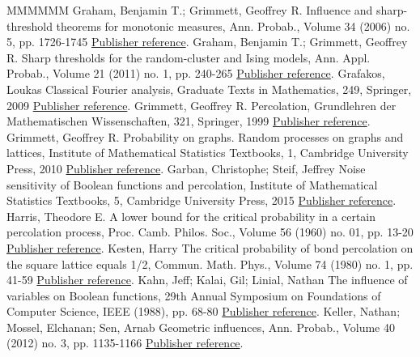 \documentclass[11pt]{article}
\theoremstyle{definition}
\numberwithin{equation}{section}
\begin{document}
\begin{thebibliography}{MMMMMM}
 Graham, Benjamin T.; Grimmett, Geoffrey R. Influence and sharp-threshold theorems for monotonic measures, Ann. Probab., Volume 34 (2006) no. 5, pp. 1726-1745 \href{https://ahl.centre-mersenne.org/item/AHL_2020__3__169_0/#graham2006influence}{Publisher reference}.
 Graham, Benjamin T.; Grimmett, Geoffrey R. Sharp thresholds for the random-cluster and Ising models, Ann. Appl. Probab., Volume 21 (2011) no. 1, pp. 240-265 \href{https://ahl.centre-mersenne.org/item/AHL_2020__3__169_0/#graham2011sharp}{Publisher reference}.
 Grafakos, Loukas Classical Fourier analysis, Graduate Texts in Mathematics, 249, Springer, 2009 \href{https://ahl.centre-mersenne.org/item/AHL_2020__3__169_0/#grafakos}{Publisher reference}.
 Grimmett, Geoffrey R. Percolation, Grundlehren der Mathematischen Wissenschaften, 321, Springer, 1999 \href{https://ahl.centre-mersenne.org/item/AHL_2020__3__169_0/#grimmett1999percolation}{Publisher reference}.
 Grimmett, Geoffrey R. Probability on graphs. Random processes on graphs and lattices, Institute of Mathematical Statistics Textbooks, 1, Cambridge University Press, 2010 \href{https://ahl.centre-mersenne.org/item/AHL_2020__3__169_0/#grimmett2010probability}{Publisher reference}.
 Garban, Christophe; Steif, Jeffrey Noise sensitivity of Boolean functions and percolation, Institute of Mathematical Statistics Textbooks, 5, Cambridge University Press, 2015 \href{https://ahl.centre-mersenne.org/item/AHL_2020__3__169_0/#garban2014noise}{Publisher reference}.
 Harris, Theodore E. A lower bound for the critical probability in a certain percolation process, Proc. Camb. Philos. Soc., Volume 56 (1960) no. 01, pp. 13-20 \href{https://ahl.centre-mersenne.org/item/AHL_2020__3__169_0/#harris1960lower}{Publisher reference}.
 Kesten, Harry The critical probability of bond percolation on the square lattice equals 1/2, Commun. Math. Phys., Volume 74 (1980) no. 1, pp. 41-59 \href{https://ahl.centre-mersenne.org/item/AHL_2020__3__169_0/#kesten1980critical}{Publisher reference}.
 Kahn, Jeff; Kalai, Gil; Linial, Nathan The influence of variables on Boolean functions, 29th Annual Symposium on Foundations of Computer Science, IEEE (1988), pp. 68-80 \href{https://ahl.centre-mersenne.org/item/AHL_2020__3__169_0/#kahn1988influence}{Publisher reference}.
 Keller, Nathan; Mossel, Elchanan; Sen, Arnab Geometric influences, Ann. Probab., Volume 40 (2012) no. 3, pp. 1135-1166 \href{https://ahl.centre-mersenne.org/item/AHL_2020__3__169_0/#keller2012geometric}{Publisher reference}.

\end{thebibliography}
\end{document}

